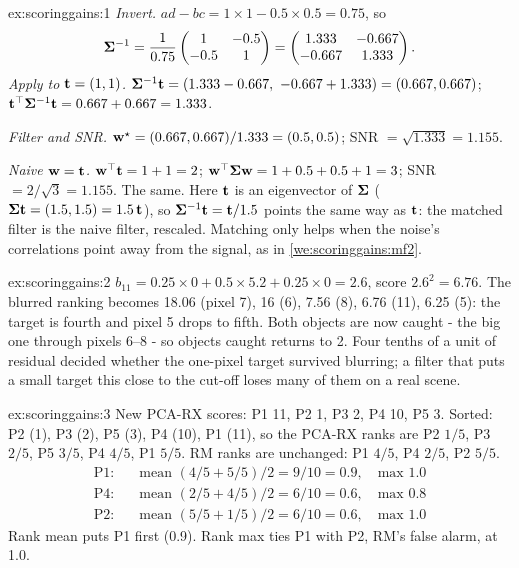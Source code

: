 
\begin{solution}{ex:scoringgains:1}
\emph{Invert.} $ad - bc = 1 \times 1 - 0.5 \times 0.5 = 0.75$, so
\[
\boldsymbol{\Sigma}^{-1} = \frac{1}{0.75}\begin{pmatrix} 1 & -0.5 \\ -0.5 & 1\end{pmatrix} = \begin{pmatrix} 1.333 & -0.667 \\ -0.667 & 1.333\end{pmatrix}.
\]
\emph{Apply to $\mathbf{t} = (1, 1)$.} $\boldsymbol{\Sigma}^{-1}\mathbf{t} = (1.333 - 0.667,\ -0.667 + 1.333) = (0.667, 0.667)$;
$\mathbf{t}^{\top}\boldsymbol{\Sigma}^{-1}\mathbf{t} = 0.667 + 0.667 = 1.333$.

\emph{Filter and SNR.} $\mathbf{w}^\star = (0.667, 0.667) / 1.333 = (0.5, 0.5)$; SNR $= \sqrt{1.333} = 1.155$.

\emph{Naive $\mathbf{w} = \mathbf{t}$.} $\mathbf{w}^{\top}\mathbf{t} = 1 + 1 = 2$; $\mathbf{w}^{\top}\boldsymbol{\Sigma}\mathbf{w} = 1 + 0.5 + 0.5 + 1 = 3$; SNR $=
2 / \sqrt{3} = 1.155$. The same. Here $\mathbf{t}$ is an eigenvector of $\boldsymbol{\Sigma}$ ($\boldsymbol{\Sigma}\mathbf{t} = (1.5, 1.5) = 1.5\,\mathbf{t}$),
so $\boldsymbol{\Sigma}^{-1}\mathbf{t} = \mathbf{t} / 1.5$ points the same way as $\mathbf{t}$: the matched filter is the naive filter, rescaled.
Matching only helps when the noise's correlations point away from the signal, as in \cref{we:scoringgains:mf2}.
\end{solution}

\begin{solution}{ex:scoringgains:2}
$b_{11} = 0.25 \times 0 + 0.5 \times 5.2 + 0.25 \times 0 = 2.6$, score $2.6^2 = 6.76$. The blurred ranking becomes 18.06
(pixel 7), 16 (6), 7.56 (8), 6.76 (11), 6.25 (5): the target is fourth and pixel 5 drops to fifth. Both objects are now
caught - the big one through pixels 6--8 - so objects caught returns to 2. Four tenths of a unit of residual decided whether
the one-pixel target survived blurring; a filter that puts a small target this close to the cut-off loses many of them on
a real scene.
\end{solution}

\begin{solution}{ex:scoringgains:3}
New PCA-RX scores: P1 11, P2 1, P3 2, P4 10, P5 3. Sorted: P2 (1), P3 (2), P5 (3), P4 (10), P1 (11), so the PCA-RX ranks
are P2 $1/5$, P3 $2/5$, P5 $3/5$, P4 $4/5$, P1 $5/5$. RM ranks are unchanged: P1 $4/5$, P4 $2/5$, P2 $5/5$.
\begin{align*}
\text{P1:}\quad & \text{mean } (4/5 + 5/5)/2 = 9/10 = 0.9, \quad \text{max } 1.0\\
\text{P4:}\quad & \text{mean } (2/5 + 4/5)/2 = 6/10 = 0.6, \quad \text{max } 0.8\\
\text{P2:}\quad & \text{mean } (5/5 + 1/5)/2 = 6/10 = 0.6, \quad \text{max } 1.0
\end{align*}
Rank mean puts P1 first (0.9). Rank max ties P1 with P2, RM's false alarm, at 1.0.
\end{solution}


